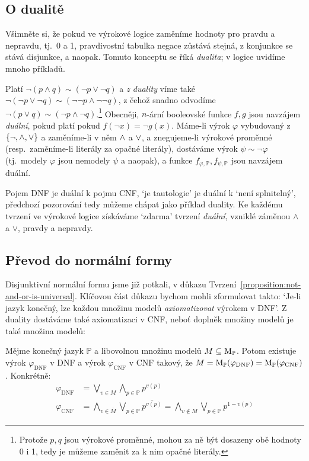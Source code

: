 \subsection{O dualitě}

Všimněte si, že pokud ve výrokové logice zaměníme hodnoty pro pravdu a nepravdu, tj.\ 0 a 1, pravdivostní tabulka negace zůstává stejná, z konjunkce se stává disjunkce, a naopak. Tomuto konceptu se říká \emph{dualita}; v logice uvidíme mnoho příkladů.

Platí $\neg(p\land q)\sim (\neg p\lor \neg q)$ a \emph{z duality} víme také $\neg(\neg p\lor \neg q)\sim (\neg \neg p\land \neg \neg q)$, z čehož snadno odvodíme $\neg(p\lor q)\sim (\neg p\land \neg q)$.\footnote{Protože $p,q$ jsou výrokové proměnné, mohou za ně být dosazeny obě hodnoty 0 i 1, tedy je můžeme zaměnit za k nim opačné literály.} Obecněji, $n$-ární booleovské funkce $f,g$ jsou navzájem \emph{duální}, pokud platí pokud $f(\neg x)=\neg g(x)$. Máme-li výrok $\varphi$ vybudovaný z $\{\neg,{\land},{\lor}\}$ a zaměníme-li v něm ${\land}$ a ${\lor}$, a znegujeme-li výrokové proměnné (resp.\ zaměníme-li literály za opačné literály), dostáváme výrok $\psi\sim\neg\varphi$ (tj.\ modely $\varphi$ jsou nemodely $\psi$ a naopak), a funkce $f_{\varphi,\mathbb P},f_{\psi,\mathbb P}$ jsou navzájem duální.

Pojem DNF je duální k pojmu CNF, `je tautologie' je duální k `není splnitelný', předchozí pozorování tedy můžeme chápat jako příklad duality. Ke každému tvrzení ve výrokové logice získáváme `zdarma' tvrzení \emph{duální}, vzniklé záměnou $\land$ a $\lor$, pravdy a nepravdy.


\subsection{Převod do normální formy}\label{subsection:convert-to-normal-form}

Disjunktivní normální formu jsme již potkali, v důkazu Tvrzení~\ref{proposition:not-and-or-is-universal}. Klíčovou část důkazu bychom mohli zformulovat takto: `Je-li jazyk konečný, lze každou množinu modelů \emph{axiomatizovat} výrokem v DNF'. Z duality dostáváme také axiomatizaci v CNF, neboť doplněk množiny modelů je také množina modelů:

\begin{proposition} \label{proposition:axiomatize-in-DNF-CNF}
    Mějme konečný jazyk $\mathbb P$ a libovolnou množinu modelů $M\subseteq\operatorname{M}_\mathbb P$. Potom existuje výrok $\varphi_{\mathrm{DNF}}$ v DNF a výrok $\varphi_{\mathrm{CNF}}$ v CNF takový, že $M=\operatorname{M}_\mathbb P(\varphi_{\mathrm{DNF}})=\operatorname{M}_\mathbb P(\varphi_{\mathrm{CNF}})$. Konkrétně:
\begin{align*}
    \varphi_{\mathrm{\mathrm{DNF}}} &= \bigvee_{v\in M}\bigwedge_{p\in\mathbb P}p^{v(p)}\\
    \varphi_{\mathrm{CNF}} &= \bigwedge_{v\in \overline{M}}\bigvee_{p\in\mathbb P}\overline{p^{v(p)}}=\bigwedge_{v\notin M}\bigvee_{p\in\mathbb P}p^{1-v(p)}
\end{align*}
\end{proposition}


